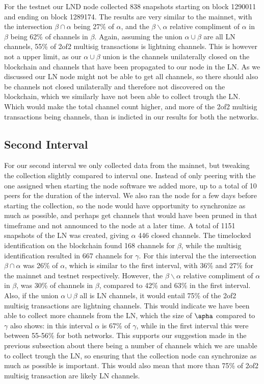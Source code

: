 For the testnet our LND node collected 838 snapshots starting on block 1290011 and ending on block 1289174. The results are very similar to the mainnet, with the intersection $\beta \cap \alpha$ being 27\% of $\alpha$,
and the $\beta \backslash{} \alpha$ relative compliment of $\alpha$ in $\beta$ being 62\% of channels in $\beta$.
Again, assuming the union $\alpha \cup \beta$ are all LN channels, 55\% of 2of2 multisig transactions is lightning channels. This is however not a upper limit, as our $\alpha \cup \beta$ union is the channels unilaterally closed on the blockchain and channels that have been propagated to our node in the LN. As we discussed our LN node might not be able to get all channels, so there should also be channels not closed unilaterally and therefore not discovered on the blockchain, which we similarly have not been able to collect trough the LN. 
Which would make the total channel count higher, and more of the 2of2 multisig transactions being channels, than is indicted in our results for both the networks.

\subsection{Second Interval}


For our second interval we only collected data from the mainnet, but tweaking the collection slightly compared to interval one. Instead of only peering with the one assigned when starting the node software we added more, up to a total of 10 peers for the duration of the interval. We also ran the node for a few days before starting the collection, so the node would have opportunity to synchronize as much as possible, and perhaps get channels that would have been pruned in that timeframe and not announced to the node at a later time. A total of 1151 snapshots of the LN was created, giving $\alpha$ 446 closed channels. The timelocked identification on the blockchain found  168 channels for $\beta$, while the multisig identification resulted in 667 channels for $\gamma$. For this interval the the intersection $\beta \cap \alpha$ was 26\% of $\alpha$, which is similar to the first interval, with 36\% and 27\% for the mainnet and testnet respectively. However, the $\beta \backslash{} \alpha$ relative compliment of $\alpha$ in $\beta$, was 30\% of channels in $\beta$, compared to 42\% and 63\% in the first interval. Also, if the union $\alpha \cup \beta$ all is LN channels, it would entail 75\% of the 2of2 multisig transactions are lightning channels. This would indicate we have been able to collect more channels from the LN, which the size of $\apha$ compared to $\gamma$ also shows: in this interval $\alpha$ is 67\% of $\gamma$, while in the first interval this were between 55-56\% for both networks. This supports our suggestion made in the previous subsection about there being a number of channels which we are unable to collect trough the LN, so ensuring that the collection node can synchronize as much as possible is important.
This would also mean that more than 75\% of 2of2 multisig transaction are likely LN channels. 


